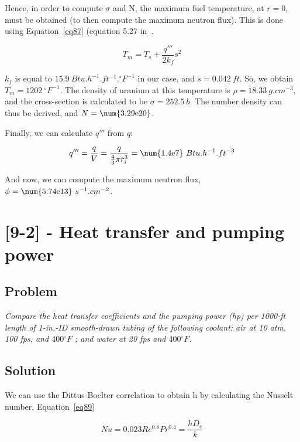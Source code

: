 Hence, in order to compute $\sigma$ and N, the maximum fuel temperature, at $r=0$, must be obtained (to then compute the maximum neutron flux). This is done using Equation~\ref{eq87} (equation 5.27 in~\cite{book01}.

\begin{equation}\label{eq87}
T_m = T_s + \frac{q'''}{2k_f}s^2
\end{equation}

$k_f$ is equal to $15.9\ Btu.h^{-1}.ft^{-1}.{}^\circ F^{-1}$ in our case, and $s = 0.042\ ft$. So, we obtain $T_m = 1202\ {}^\circ F^{-1}$. The density of uranium at this temperature is $\rho = 18.33\ g.cm^{-3}$, and the cross-section is calculated to be $\sigma = 252.5\ b$. The number density can thus be derived, and $N = \text{\num{3.29e20}}$.


Finally, we can calculate $q'''$ from $q$:

\begin{equation}\label{eq88}
q''' = \frac{q}{V} = \frac{q}{\frac{4}{3}\pi r_i^3} = \text{\num{1.4e7}}\ Btu.h^{-1}.ft^{-3}
\end{equation}

And now, we can compute the maximum neutron flux, $\phi = \text{\num{5.74e13}}\ s^{-1}.cm^{-2}$.


\section{[9-2] - Heat transfer and pumping power}
\label{prob82}

\subsection{Problem}
\textit{Compare the heat transfer coefficients and the pumping power (hp) per 1000-ft length of 1-in.-ID smooth-drawn tubing of the following coolant: air at 10 atm, 100 fps, and $400{}^\circ F$ ; and water at 20 fps and $400{}^\circ F$.}

\subsection{Solution}

We can use the Dittus-Boelter correlation to obtain h by calculating the Nusselt number, Equation~\ref{eq89}

\begin{equation}\label{eq89}
Nu = 0.023Re^{0.8}Pr^{0.4} = \frac{hD_e}{k}
\end{equation}


